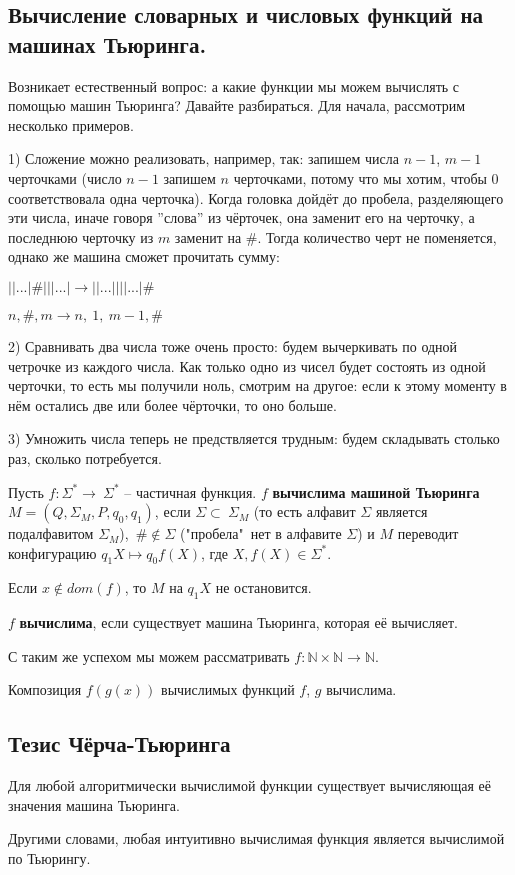 \subsection*{Вычисление словарных и числовых функций на машинах Тьюринга.}
\par Возникает естественный вопрос: а какие функции мы можем вычислять с помощью машин Тьюринга? Давайте разбираться. Для начала, рассмотрим несколько примеров.
\par 
\begin{example}
\par 1) Сложение можно реализовать, например, так: запишем числа $n-1$, $m-1$ черточками (число $n-1$ запишем $n$ черточками, потому что мы хотим, чтобы 0 соответствовала одна черточка). Когда головка дойдёт до пробела, разделяющего эти числа, иначе говоря ''слова'' из чёрточек, она заменит его на черточку, а последнюю черточку из $m$ заменит на $\#$. Тогда количество черт не поменяется, однако же машина сможет прочитать сумму:
\par $||...| \#|||...| \to ||...||||...|\#$
\par $n, \#, m \to n,\ 1,\ m-1, \#$
\par 2) Сравнивать два числа тоже очень просто: будем вычеркивать по одной четрочке из каждого числа. Как только одно из чисел будет состоять из одной черточки, то есть мы получили ноль, смотрим на другое: если к этому моменту в нём остались две или более чёрточки, то оно больше.
\par 3) Умножить числа теперь не предствляется трудным: будем складывать столько раз, сколько потребуется. 
\end{example}
\par 
\begin{definition}
 Пусть $f : \Sigma^* \to\ \Sigma^*$ -- частичная функция. $f$ \textbf{вычислима машиной Тьюринга} $M=(Q, \Sigma_{M}, P, q_{0}, q_{1})$, если $\Sigma \subset\ \Sigma_{M}$ (то есть алфавит $\Sigma$ является подалфавитом $\Sigma_{M}$),\ $\# \notin \Sigma$ ("пробела"\ нет в алфавите $\Sigma$) и $M$ переводит конфигурацию $q_{1}X \mapsto q_{0}f(X)$, где $X, f(X) \in \Sigma^*$.
\end{definition}
 \par Если $x \notin dom(f)$, то $M$ на $q_{1}X$ не остановится.
\begin{definition} $f$ \textbf{вычислима}, если существует машина Тьюринга, которая её вычисляет.
\end{definition}

\begin{remark}
\par С таким же успехом мы можем рассматривать $f: \mathbb{N} \times \mathbb{N} \to \mathbb{N}$. 
\end{remark}
\begin{remark}
\par Композиция $f(g(x))$ вычислимых функций $f$, $g$ вычислима.
\end{remark}
\subsection*{Тезис Чёрча-Тьюринга}
 \begin{theorem} Для любой алгоритмически вычислимой функции существует вычисляющая её значения машина Тьюринга.
\end{theorem}
Другими словами, любая интуитивно вычислимая функция является вычислимой по Тьюрингу.
